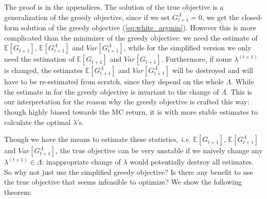\documentclass{article}
\newcommand\ie{\textit{i.e.}}
\newcommand\doubleE{\mathbb{E}}
\begin{document}
The proof is in the appendices. The solution of the true objective is a generalization of the greedy objective, since if we set $G_{t+1}^\Lambda = 0$, we get the closed-form solution of the greedy objective (\ref{eq:white_argmin}). However this is more complicated than the minimizer of the greedy objective: we need the estimate of $\doubleE[G_{t+1}]$, $\doubleE[G_{t+1}^\Lambda]$ and $Var[G_{t+1}^\Lambda]$, while for the simplified version we only need the estimation of $\doubleE[G_{t+1}]$ and $Var[G_{t+1}]$. Furthermore, if some $\lambda^{(t+1)}$ is changed, the estimates $\doubleE[G_{t+1}^\Lambda]$ and $Var[G_{t+1}^\Lambda]$ will be destroyed and will have to be re-estimated from scratch, since they depend on the whole $\Lambda$. While the estimate in for the greedy objective is invariant to the change of $\Lambda$. This is our interpretation for the reason why the greedy objective is crafted this way: though highly biased towards the MC return, it is with more stable estimates to calculate the optimal $\lambda$'s.
\par
Though we have the means \cite{sherstan2018directly} to estimate these statistics, \ie{} $\doubleE[G_{t+1}]$, $\doubleE[G_{t+1}^\Lambda]$ and $Var[G_{t+1}^\Lambda]$, the true objective can be very unstable if we naively change any $\lambda^{(t+1)} \in \Lambda$: inappropriate change of $\lambda$ would potentially destroy all estimates. So why not just use the simplified greedy objective? Is there any benefit to use the true objective that seems infeasible to optimize? We show the following theorem:
\end{document}
